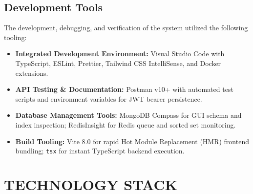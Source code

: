 \documentclass[12pt,a4paper]{report}
\begin{document}
\section{Development Tools}
The development, debugging, and verification of the system utilized the following tooling:
\begin{itemize}[leftmargin=*]
  \item \textbf{Integrated Development Environment:} Visual Studio Code with TypeScript, ESLint, Prettier, Tailwind CSS IntelliSense, and Docker extensions.
  \item \textbf{API Testing \& Documentation:} Postman v10+ with automated test scripts and environment variables for JWT bearer persistence.
  \item \textbf{Database Management Tools:} MongoDB Compass for GUI schema and index inspection; RedisInsight for Redis queue and sorted set monitoring.
  \item \textbf{Build Tooling:} Vite 8.0 for rapid Hot Module Replacement (HMR) frontend bundling; \texttt{tsx} for instant TypeScript backend execution.
\end{itemize}

\clearpage

\chapter{TECHNOLOGY STACK}
\end{document}
